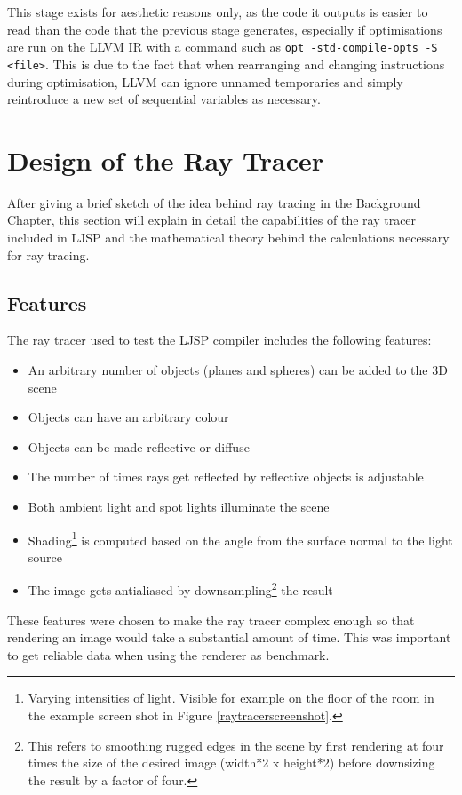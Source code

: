 \documentclass[11pt]{report}
\begin{document}
This stage exists for aesthetic reasons only, as the code it outputs is easier to read than the code that the previous stage generates, especially if optimisations are run on the LLVM IR with a command such as \texttt{opt -std-compile-opts -S <file>}. This is due to the fact that when rearranging and changing instructions during optimisation, LLVM can ignore unnamed temporaries and simply reintroduce a new set of sequential variables as necessary. 

\section{Design of the Ray Tracer}
After giving a brief sketch of the idea behind ray tracing in the Background Chapter, this section will explain in detail the capabilities of the ray tracer included in LJSP and the mathematical theory behind the calculations necessary for ray tracing.

\subsection{Features}

The ray tracer used to test the LJSP compiler includes the following features:
\begin{itemize}
\item An arbitrary number of objects (planes and spheres) can be added to the 3D scene
\item Objects can have an arbitrary colour
\item Objects can be made reflective or diffuse
\item The number of times rays get reflected by reflective objects is adjustable
\item Both ambient light and spot lights illuminate the scene
\item Shading\footnote{Varying intensities of light. Visible for example on the floor of the room in the example screen shot in Figure \ref{raytracerscreenshot}.} is computed based on the angle from the surface normal to the light source
\item The image gets antialiased by downsampling\footnote{This refers to smoothing rugged edges in the scene by first rendering at four times the size of the desired image (width*2 x height*2) before downsizing the result by a factor of four.} the result 
\end{itemize}

These features were chosen to make the ray tracer complex enough so that rendering an image would take a substantial amount of time. This was important to get reliable data when using the renderer as benchmark.
\end{document}

